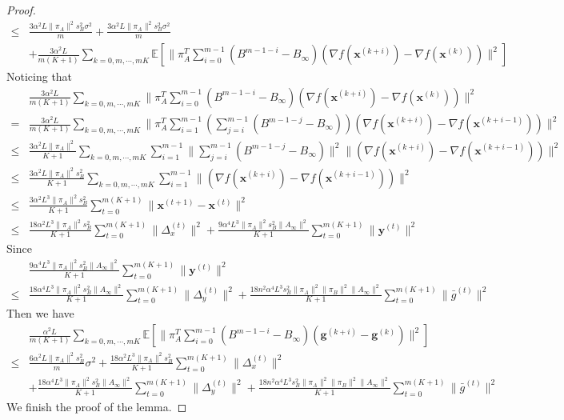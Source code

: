\documentclass{article}
\newcommand{\vg}{{\mathbf{g}}}
\newcommand{\vx}{{\mathbf{x}}}
\newcommand{\vy}{{\mathbf{y}}}
\newcommand{\EE}[1]{\mathbb{E}\left[#1\right]}
\newcommand{\norm}[1]{\| #1 \|}
\begin{document}
\begin{proof}
\begin{align*}
    \leq& \frac{3\alpha^2L\norm{\pi_A}^2s_B^2\sigma^2}{m}+\frac{3\alpha^2L\norm{\pi_A}^2s_B^2\sigma^2}{m}\\&+\frac{3\alpha^2L}{m(K+1)}\sum_{k=0,m,\cdots,mK}\EE{\norm{\pi_A^T\sum_{i=0}^{m-1}(B^{m-1-i}-B_{\infty})(\nabla f(\vx^{(k+i)})-\nabla f(\vx^{(k)}))}^2}
  \end{align*}
  Noticing that 
  \begin{align*}
    &\frac{3\alpha^2L}{m(K+1)}\sum_{k=0,m,\cdots,mK}\norm{\pi_A^T\sum_{i=0}^{m-1}(B^{m-1-i}-B_{\infty})(\nabla f(\vx^{(k+i)})-\nabla f(\vx^{(k)}))}^2
    \\ =&\frac{3\alpha^2L}{m(K+1)}\sum_{k=0,m,\cdots,mK}\norm{\pi_A^T\sum_{i=1}^{m-1}(\sum_{j=i}^{m-1}(B^{m-1-j}-B_{\infty}))(\nabla f(\vx^{(k+i)})-\nabla f(\vx^{(k+i-1)}))}^2
    \\ \leq& \frac{3\alpha^2L\norm{\pi_A}^2}{K+1}\sum_{k=0,m,\cdots,mK}\sum_{i=1}^{m-1}\norm{\sum_{j=i}^{m-1}(B^{m-1-j}-B_{\infty})}^2\norm{(\nabla f(\vx^{(k+i)})-\nabla f(\vx^{(k+i-1)}))}^2\\
    \leq&\frac{3\alpha^2L\norm{\pi_A}^2s_B^2}{K+1}\sum_{k=0,m,\cdots,mK}\sum_{i=1}^{m-1}\norm{(\nabla f(\vx^{(k+i)})-\nabla f(\vx^{(k+i-1)}))}^2\\
    \leq&\frac{3\alpha^2L^3\norm{\pi_A}^2s_B^2}{K+1}\sum_{t=0}^{m(K+1)}\norm{\vx^{(t+1)}-\vx^{(t)}}^2\\
    \leq&\frac{18\alpha^2L^3\norm{\pi_A}^2s_B^2}{K+1}\sum_{t=0}^{m(K+1)}\norm{\Delta_x^{(t)}}^2+\frac{9\alpha^4L^3\norm{\pi_A}^2s_B^2\norm{A_{\infty}}^2}{K+1}\sum_{t=0}^{m(K+1)}\norm{\vy^{(t)}}^2
  \end{align*}
  Since 
  \begin{align*}
    &\frac{9\alpha^4L^3\norm{\pi_A}^2s_B^2\norm{A_{\infty}}^2}{K+1}\sum_{t=0}^{m(K+1)}\norm{\vy^{(t)}}^2\\\leq&\frac{18\alpha^4L^3\norm{\pi_A}^2s_B^2\norm{A_{\infty}}^2}{ K+1}\sum_{t=0}^{m(K+1)}\norm{\Delta_y^{(t)}}^2+\frac{18n^2\alpha^4L^3s_B^2\norm{\pi_A}^2\norm{\pi_B}^2\norm{A_{\infty}}^2}{ K+1}\sum_{t=0}^{m(K+1)}\norm{\bar{g}^{(t)}}^2
  \end{align*}
  Then we have
  \begin{align*}
    &\frac{\alpha^2L}{m(K+1)}\sum_{k=0,m,\cdots,mK}\EE{\norm{\pi_A^{T}\sum_{i=0}^{m-1}(B^{m-1-i}-B_{\infty})(\vg^{(k+i)}-\vg^{(k)})}^2}\\
    \leq& \frac{6\alpha^2L\norm{\pi_A}^2s_B^2}{m}\sigma^2+\frac{18\alpha^2L^3\norm{\pi_A}^2s_B^2}{ K+1}\sum_{t=0}^{m(K+1)}\norm{\Delta_x^{(t)}}^2\\&+\frac{18\alpha^4L^3\norm{\pi_A}^2s_B^2\norm{A_{\infty}}^2}{ K+1}\sum_{t=0}^{m(K+1)}\norm{\Delta_y^{(t)}}^2+\frac{18n^2\alpha^4L^3s_B^2\norm{\pi_A}^2\norm{\pi_B}^2\norm{A_{\infty}}^2}{ K+1}\sum_{t=0}^{m(K+1)}\norm{\bar{g}^{(t)}}^2
  \end{align*}
  We finish the proof of the lemma.
\end{proof}
\end{document}
